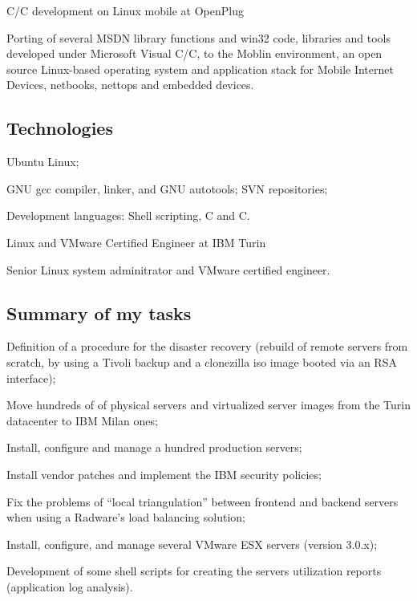 
   {C/C\plusplus{} development on Linux mobile at OpenPlug}

Porting of several MSDN library functions and win32 code, libraries and tools
developed under Microsoft Visual C/C\plusplus, to the Moblin environment,
an open source Linux-based operating system and application stack for
Mobile Internet Devices, netbooks, nettops and embedded devices.

\subsection{Technologies}

\item{\bdot} Ubuntu Linux;
\item{\bdot} GNU gcc compiler, linker, and GNU autotools; SVN repositories;
\item{\bdot} Development languages: Shell scripting, C and C\plusplus.

   {Linux and VMware Certified Engineer at IBM Turin}

Senior Linux system adminitrator and VMware certified engineer.

\subsection{Summary of my tasks}

\item{\bdot} Definition of a procedure for the disaster recovery 
   (rebuild of remote servers from scratch, by using a Tivoli backup and a 
    clonezilla iso image booted via an RSA interface);
\item{\bdot} Move hundreds of of physical servers and virtualized server 
   images from the Turin datacenter to IBM Milan ones;
\item{\bdot} Install, configure and manage a hundred production servers;
\item{\bdot} Install vendor patches and implement the IBM security policies;
\item{\bdot} Fix the problems of ``local triangulation'' between frontend 
   and backend servers when using a Radware's load balancing solution;
\item{\bdot} Install, configure, and manage several VMware ESX servers 
   (version 3.0.x);
\item{\bdot} Development of some shell scripts for creating the servers 
   utilization reports (application log analysis).


